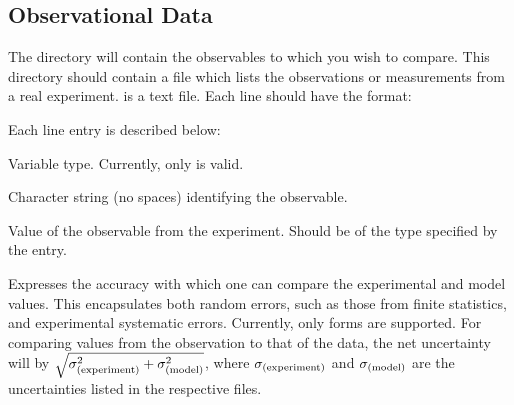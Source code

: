 \subsection{Observational Data}
The  directory will contain the observables to which you wish to compare. This directory should contain a file  which lists the observations or measurements from a real experiment.  is a text file. Each line should have the format:


Each line entry is described below:

\begin{description}

\item {}

Variable type. Currently, only  is valid.

\item {}

Character string (no spaces) identifying the observable.

\item {}

Value of the observable from the experiment. Should be of the type specified by the  entry.

\item {}

Expresses the accuracy with which one can compare the experimental and model values. This encapsulates both random errors, such as those from finite statistics, and experimental systematic errors. Currently, only  forms are supported. For comparing  values from the observation to that of the data, the net uncertainty will by $\sqrt{\sigma_{\rm(experiment)}^2+\sigma_{\rm(model)}^2}$, where $\sigma_{\rm(experiment)}$ and $\sigma_{\rm(model)}$ are the uncertainties listed in the respective  files.

\end{description}



